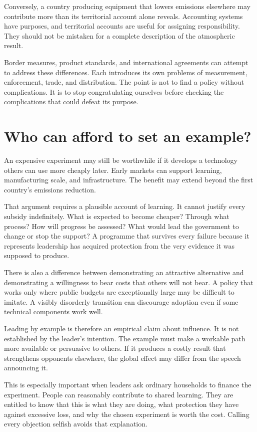 \documentclass[12pt,a4paper]{book}
\begin{document}
Conversely, a country producing equipment that lowers emissions elsewhere may contribute more than its territorial account alone reveals. Accounting systems have purposes, and territorial accounts are useful for assigning responsibility. They should not be mistaken for a complete description of the atmospheric result.

Border measures, product standards, and international agreements can attempt to address these differences. Each introduces its own problems of measurement, enforcement, trade, and distribution. The point is not to find a policy without complications. It is to stop congratulating ourselves before checking the complications that could defeat its purpose.

\section*{Who can afford to set an example?}

An expensive experiment may still be worthwhile if it develops a technology others can use more cheaply later. Early markets can support learning, manufacturing scale, and infrastructure. The benefit may extend beyond the first country's emissions reduction.

That argument requires a plausible account of learning. It cannot justify every subsidy indefinitely. What is expected to become cheaper? Through what process? How will progress be assessed? What would lead the government to change or stop the support? A programme that survives every failure because it represents leadership has acquired protection from the very evidence it was supposed to produce.

There is also a difference between demonstrating an attractive alternative and demonstrating a willingness to bear costs that others will not bear. A policy that works only where public budgets are exceptionally large may be difficult to imitate. A visibly disorderly transition can discourage adoption even if some technical components work well.

Leading by example is therefore an empirical claim about influence. It is not established by the leader's intention. The example must make a workable path more available or persuasive to others. If it produces a costly result that strengthens opponents elsewhere, the global effect may differ from the speech announcing it.

This is especially important when leaders ask ordinary households to finance the experiment. People can reasonably contribute to shared learning. They are entitled to know that this is what they are doing, what protection they have against excessive loss, and why the chosen experiment is worth the cost. Calling every objection selfish avoids that explanation.
\end{document}
